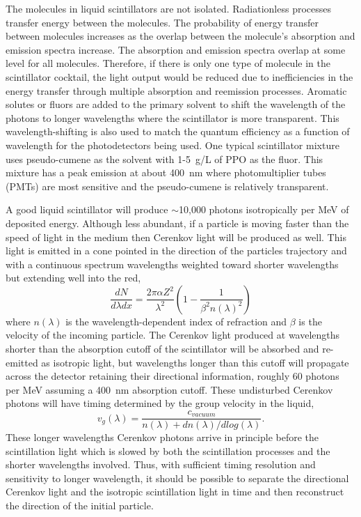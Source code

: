 \documentclass[aps,prc,twocolumn,groupedaddress,showpacs,amsmath,amssymb,floatfix,superscriptaddress]{revtex4}
\begin{document}
The molecules in liquid scintillators are not isolated. Radiationless processes transfer energy between the molecules. The probability of energy transfer between molecules increases as the overlap between the molecule's absorption and emission spectra increase. The absorption and emission spectra overlap at some level for all molecules. Therefore, if there is only one type of molecule in the scintillator cocktail, the light output would be reduced due to inefficiencies in the energy transfer through multiple absorption and reemission processes. Aromatic solutes or fluors are added to the primary solvent to shift the wavelength of the photons to longer wavelengths where the scintillator is more transparent. This wavelength-shifting is also used to match the quantum efficiency as a function of wavelength for the photodetectors being used. One typical scintillator mixture uses pseudo-cumene as the solvent with 1-5~g/L of PPO as the fluor. This mixture has a peak emission at about 400~nm where photomultiplier tubes (PMTs) are most sensitive and the pseudo-cumene is relatively transparent.

A good liquid scintillator will produce $\sim$10,000 photons isotropically per MeV of deposited energy. Although less abundant, if a particle is moving faster than the speed of light in the medium then Cerenkov light will be produced as well. This light is emitted in a cone pointed in the direction of the particles trajectory and with a continuous spectrum wavelengths weighted toward shorter wavelengths but extending well into the red,
\begin{equation}
\label{eqCerenkov}
\frac{dN}{d\lambda dx} = \frac{2 \pi \alpha Z^2}{\lambda^2} ( 1 - \frac{1}{\beta^2 n(\lambda)^2} )
\end{equation}
where $n(\lambda)$ is the wavelength-dependent index of refraction and $\beta$ is the velocity of the incoming particle. The Cerenkov light produced at wavelengths shorter than the absorption cutoff of the scintillator will be absorbed and re-emitted as isotropic light, but wavelengths longer than this cutoff will propagate across the detector retaining their directional information, roughly 60 photons per MeV assuming a 400~nm absorption cutoff. These undisturbed Cerenkov photons will have timing determined by the group velocity in the liquid,
\begin{equation}
\label{eqGroup}
v_{g}(\lambda) = \frac{c_{vacuum}}{n(\lambda) + dn(\lambda)/dlog(\lambda)}.
\end{equation}
These longer wavelengths Cerenkov photons arrive in principle before the scintillation light which is slowed by both the scintillation processes and the shorter wavelengths involved. Thus, with sufficient timing resolution and sensitivity to longer wavelength, it should be possible to separate the directional Cerenkov light and the isotropic scintillation light in time and then reconstruct the direction of the initial particle.
\end{document}
